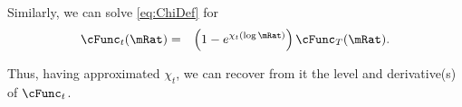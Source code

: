 \documentclass[../BufferStockTheory.tex]{subfiles}
\begin{document}
Similarly, we can solve \eqref{eq:ChiDef} for
\begin{eqnarray}
    \cFunc_{t}(\mRat) & = & \left(1-e^{\chi_{t}(\log \mRat)}\right)\cFunc_{T}(\mRat) \label{eq:cFuncFromChi}.
\end{eqnarray}

Thus, having approximated $\chi_{t}$, we can recover from it
the level and derivative(s) of $\cFunc_{t}$.

\end{document}
